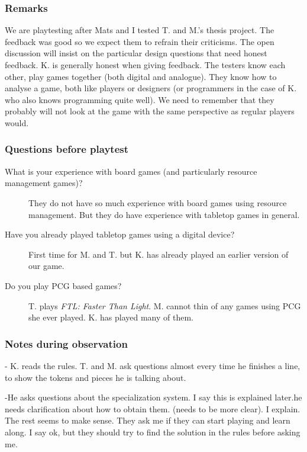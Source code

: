 \documentclass[a4paper,11pt]{report}
\begin{document}
\subsubsection{Remarks}
We are playtesting after Mats and I tested T. and M.'s thesis project. The feedback was good so we expect them to refrain their criticisms. The open discussion will insist on the particular design questions that need honest feedback. K. is generally honest when giving feedback. The testers know each other, play games together (both digital and analogue). They know how to analyse a game, both like players or designers (or programmers in the case of K. who also knows programming quite well). We need to remember that they probably will not look at the game with the same perspective as regular players would.

\subsubsection{Questions before playtest}

\begin{description}
\item[What is your experience with board games (and particularly resource management games)?] They do not have so much experience with board games using resource management. But they do have experience with tabletop games in general.
\item[Have you already played tabletop games using a digital device?] First time for M. and T. but K. has already played an earlier version of our game.
\item[Do you play PCG based games?] T. plays \textit{FTL: Faster Than Light}. M. cannot thin of any games using PCG she ever played. K. has played many of them.
\end{description}

\subsubsection{Notes during observation}

- K. reads the rules. T. and M. ask questions almost every time he finishes a line, to show the tokens and pieces he is talking about.

-He asks questions about the specialization system. I say this is explained later.he needs clarification about how to obtain them. (needs to be more clear). I explain. The rest seems to make sense. They ask me if they can start playing and learn along. I say ok, but they should try to find the solution in the rules before asking me.
\end{document}
